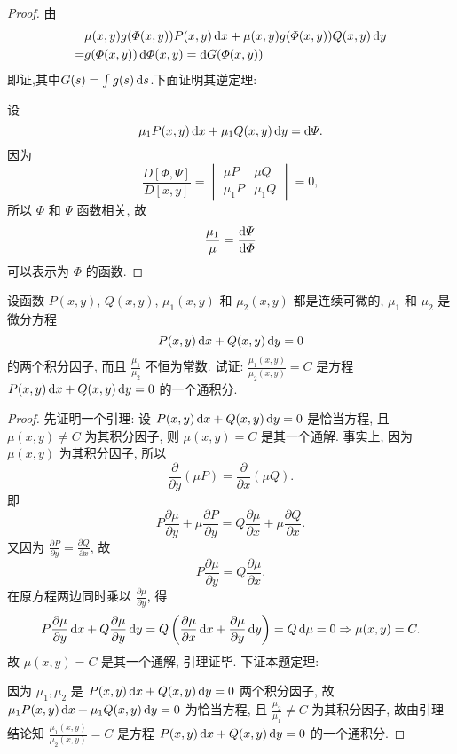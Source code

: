 \begin{proof}
由
\[\begin{split}
&\mu(x,y)g(\varPhi(x,y))P(x,y)\mathop{}\!\mathrm{d} x+\mu(x,y)g(\varPhi(x,y))Q(x,y)\mathop{}\!\mathrm{d} y\\
=&g(\varPhi(x,y))\mathop{}\!\mathrm{d}\varPhi(x,y)=\mathop{}\!\mathrm{d} G(\varPhi(x,y))
\end{split}\]
即证,其中$G(s)=\int g(s)\mathop{}\!\mathrm{d} s$.下面证明其逆定理:

设
\[\mu_1P(x,y)\mathop{}\!\mathrm{d} x+\mu_1Q(x,y)\mathop{}\!\mathrm{d} y=\mathop{}\!\mathrm{d}\varPsi.\]
因为
\[\frac{D[\varPhi,\varPsi]}{D[x,y]}=
  \begin{vmatrix}\mu P&\mu Q\\\mu_1P&\mu_1Q\end{vmatrix}=0,\]
所以 $\varPhi$ 和 $\varPsi$ 函数相关, 故 
\[\frac{\mu_1}{\mu}=\frac{\mathop{}\!\mathrm{d}\varPsi}{\mathop{}\!\mathrm{d}\varPhi}\]
可以表示为 $\varPhi$ 的函数.
\end{proof}



\begin{exercise}
  设函数 $P(x,y)$, $Q(x,y)$, $\mu_1(x,y)$ 和 $\mu_2(x,y)$ 都是连续可微的, $\mu_1$ 和 $\mu_2$ 是微分方程
  \[P(x,y)\mathop{}\!\mathrm{d} x+Q(x,y)\mathop{}\!\mathrm{d} y=0\]
  的两个积分因子, 而且 $\frac{\mu_1}{\mu_2}$ 不恒为常数.
  试证: $\frac{\mu_1(x,y)}{\mu_2(x,y)}=C$ 是方程 $P(x,y)\mathop{}\!\mathrm{d} x+Q(x,y)\mathop{}\!\mathrm{d} y\-=0$ 的一个通积分.
\end{exercise}

\begin{proof}
  先证明一个引理: 设 $P(x,y)\mathop{}\!\mathrm{d} x+Q(x,y)\mathop{}\!\mathrm{d} y=0$ 是恰当方程,
  且 $\mu(x,y)\neq C$ 为其积分因子, 则 $\mu(x,y)=C$ 是其一个通解. 事实上,
  因为 $\mu(x,y)$ 为其积分因子, 所以
  \[\frac{\partial}{\partial y}(\mu P)=\frac{\partial}{\partial x}(\mu Q).\]
  即
  \[P\frac{\partial\mu}{\partial y}+\mu\frac{\partial P}{\partial y}
    = Q\frac{\partial\mu}{\partial x}+\mu\frac{\partial Q}{\partial x}.\]
  又因为 $\frac{\partial P}{\partial y}=\frac{\partial Q}{\partial x}$, 故
  \[P\frac{\partial\mu}{\partial y}=Q\frac{\partial\mu}{\partial x}.\]
  在原方程两边同时乘以 $\frac{\partial\mu}{\partial y}$, 得
  \[P\frac{\partial\mu}{\partial y}\mathop{}\!\mathrm{d} x+Q\frac{\partial\mu}{\partial y}\mathop{}\!\mathrm{d} y
    = Q\left(\frac{\partial\mu}{\partial x}\mathop{}\!\mathrm{d} x+\frac{\partial\mu}{\partial y}\mathop{}\!\mathrm{d} y\right)
    = Q\mathop{}\!\mathrm{d}\mu=0\Rightarrow\mu(x,y)=C.\]
  故 $\mu(x,y)=C$ 是其一个通解, 引理证毕. 下证本题定理:

  因为 $\mu_1,\mu_2$ 是 $P(x,y)\mathop{}\!\mathrm{d} x+Q(x,y)\mathop{}\!\mathrm{d} y=0$ 两个积分因子,
  故 $\mu_1P(x,y)\mathop{}\!\mathrm{d} x+\mu_1Q(x,y)\mathop{}\!\mathrm{d} y=0$ 为恰当方程,
  且 $\frac{\mu_2}{\mu_1}\neq C$ 为其积分因子,
  故由引理结论知 $\frac{\mu_1(x,y)}{\mu_2(x,y)}=C$ 是方程 $P(x,y)\mathop{}\!\mathrm{d} x+Q(x,y)\mathop{}\!\mathrm{d} y=0$ 的一个通积分.
\end{proof}



